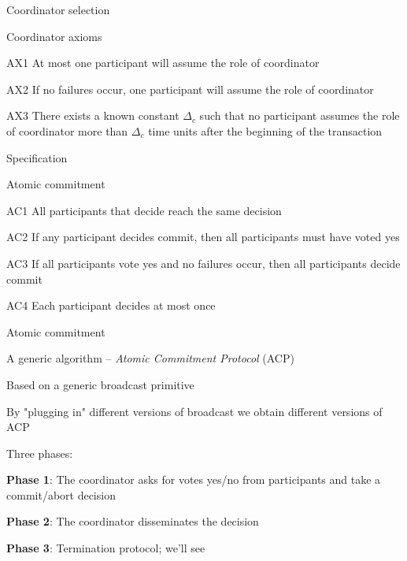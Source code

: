 \begin{frame}{Coordinator selection}

\begin{block}{\alert{Coordinator axioms}}
\BI
\item[AX1] At most one participant will assume the role of coordinator 
\item[AX2] If no failures occur, one participant will assume the role of coordinator
\item[AX3] There exists a known constant $\Delta_c$ such that no participant assumes the role of coordinator more than $\Delta_c$ time units after the beginning of the transaction
\EI
\end{block}
\end{frame}

\begin{frame}{Specification}
\begin{block}{\alert{Atomic commitment}}
\BI
\item[AC1] All participants that decide reach the same decision
\item[AC2] If any participant decides commit, then all participants must have voted yes
\item[AC3] If all participants vote yes and no failures occur, then all participants decide commit
\item[AC4] Each participant decides at most once
\EI
\end{block}
\end{frame}

\begin{frame}{Atomic commitment}

A generic algorithm – \emph{Atomic Commitment Protocol} (ACP)
\BI
  \item Based on a generic broadcast primitive
  \item By "plugging in" different versions of broadcast we obtain different versions of ACP
\EI

\bigskip
Three phases:
\BI
\item \textbf{Phase 1}:
  The coordinator asks for votes yes/no from participants and take a commit/abort decision 
\item \textbf{Phase 2}:
  The coordinator disseminates the decision
\item \textbf{Phase 3}:
  Termination protocol; we'll see	
\EI
\end{frame}

